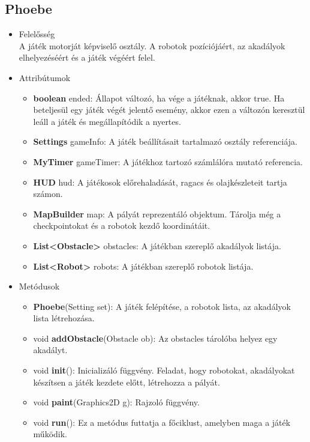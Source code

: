 \subsection{Phoebe}
\begin{itemize}
\item Felelősség\\
A játék motorját képviselő osztály. A robotok pozíciójáért, az akadályok elhelyezéséért és a játék végéért felel.
\item Attribútumok
	\begin{itemize}
		\item \textbf{boolean} ended: Állapot változó, ha vége a játéknak, akkor true. Ha beteljesül egy játék végét jelentő esemény, akkor ezen a változón keresztül leáll a játék és megállapítódik a nyertes.
		\item \textbf{Settings} gameInfo: A játék beállításait tartalmazó osztály referenciája.
		\item \textbf{MyTimer} gameTimer: A játékhoz tartozó számlálóra mutató referencia.
		\item \textbf{HUD} hud: A játékosok előrehaladását, ragacs és olajkészleteit tartja számon.
		\item \textbf{MapBuilder} map: A pályát reprezentáló objektum. Tárolja még a checkpointokat és a robotok kezdő koordinátáit.
		\item \textbf{List<Obstacle>} obstacles: A játékban szereplő akadályok listája.
		\item \textbf{List<Robot>} robots: A játékban szereplő robotok listája.
	\end{itemize}
\item Metódusok
	\begin{itemize}
		\item \textbf{Phoebe}(Setting set): A játék felépítése, a robotok lista, az akadályok lista létrehozása.
		\item void \textbf{addObstacle}(Obstacle ob): Az obstacles tárolóba helyez egy akadályt.
		\item void \textbf{init}(): Inicializáló függvény. Feladat, hogy robotokat, akadályokat készítsen a játék kezdete előtt, létrehozza a pályát.
		\item void \textbf{paint}(Graphics2D g): Rajzoló függvény.
		\item void \textbf{run}(): Ez a metódus futtatja a főciklust, amelyben maga a játék működik.
	\end{itemize}
\end{itemize}

